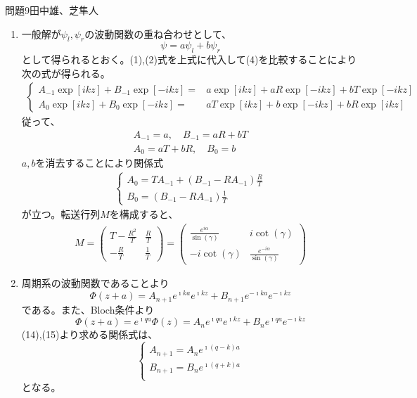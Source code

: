 \documentclass[fleqn]{jbook}
\begin{document}
\begin{answer}{問題9}{田中雄、芝隼人}
\begin{enumerate}
\item
一般解が$\psi_l ,\psi_r $の波動関数の重ね合わせとして、
\[
\psi =a\psi_l +b\psi_r
\]
として得られるとおく。(1),(2)式を上式に代入して(4)を比較することにより次の式が得られる。
\begin{eqnarray}
\left\{
\begin{array}{rl}{}
A_{-1}\exp [ikz]+B_{-1}\exp [-ikz] =& a\exp [ikz]+aR\exp [-ikz]+bT\exp [-ikz]  \\
A_{0}\exp [ikz]+B_{0}\exp [-ikz] =& aT\exp [ikz]+b\exp [-ikz]+bR\exp [ikz]
\end{array}
\right.
\end{eqnarray}
従って、
\begin{eqnarray}
A_{-1} = a,\quad B_{-1} =aR +bT \\
A_0 =aT +bR,\quad B_0 = b
\end{eqnarray}
$a,b$を消去することにより関係式
\begin{eqnarray}
\left\{ \begin{array}{l}{}
A_0 = \displaystyle TA_{-1} + (B_{-1} -RA_{-1} )\frac{R}{T} \\
B_0 = \displaystyle(B_{-1} -RA_{-1} )\frac{1}{T}
\end{array}\right.
\end{eqnarray}
が立つ。転送行列$M$を構成すると、
\begin{eqnarray}
M= \left( \begin{array}{cc}{}
T-\displaystyle\frac{R^2}{T} & \displaystyle\frac{R}{T} \\ 
-\displaystyle\frac{R}{T} & \displaystyle\frac{1}{T}
\end{array}\right) = \left( \begin{array}{cc}{}
\displaystyle\frac{e^{i\alpha}}{\sin (\gamma) } & i \cot (\gamma ) \\
-i\cot (\gamma ) & \displaystyle\frac{e^{-i\alpha}}{\sin (\gamma ) }
\end{array} \right)
\end{eqnarray} 

\item
周期系の波動関数であることより
\begin{equation}
\Phi (z+a)=A_{n+1}e^{\imath ka}e^{\imath kz}+B_{n+1}e^{-\imath ka}e^{-\imath kz}
\end{equation}
である。また、Bloch条件より
\begin{equation}
\Phi (z+a)=e^{\imath qa}\Phi (z) = A_{n}e^{\imath qa}e^{\imath kz}+B_{n}e^{\imath qa}e^{-\imath kz}
\end{equation}
(14),(15)より求める関係式は、
\begin{equation}
\left\{
  \begin{array}{c}
    A_{n+1}=A_{n}e^{\imath (q-k)a}   \\
    B_{n+1}=B_{n}e^{\imath (q+k)a}   \\
  \end{array}
\right.
\end{equation}
となる。\\


\end{enumerate}
\end{answer}
\end{document}
